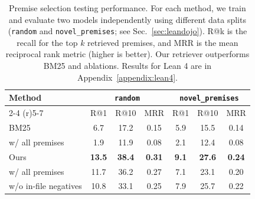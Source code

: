 \begin{table}[ht]
  \centering
  \caption{Premise selection testing performance. For each method, we train and evaluate two models independently using different data splits (\texttt{random} and \texttt{novel\_premises}; see Sec.~\ref{sec:leandojo}). R@k is the recall for the top $k$ retrieved premises, and MRR is the mean reciprocal rank metric (higher is better). Our retriever outperforms BM25 and ablations. Results for Lean 4 are in Appendix~\ref{appendix:lean4}.}
  \begin{tabular}{@{}lcccccc@{}}
    \toprule
     Method & \multicolumn{3}{c}{\texttt{random}} & \multicolumn{3}{c}{\texttt{novel\_premises}} \\
     \cmidrule(r){2-4} \cmidrule(r){5-7} & R@1 & R@10 & MRR & R@1 & R@10 & MRR \\
    \midrule
    BM25 & 6.7 & 17.2 & 0.15 & 5.9 & 15.5 & 0.14\\
    \quad w/ all premises & 1.9 & 11.9 & 0.08 & 2.1 & 12.4 & 0.08 \\
    Ours & \textbf{13.5} & \textbf{38.4} & \textbf{0.31} & \textbf{9.1} & \textbf{27.6} & \textbf{0.24} \\
    \quad w/ all premises & 11.7 & 36.2 & 0.27 & 7.1 & 23.1 & 0.20 \\
    \quad w/o in-file negatives & 10.8 & 33.1 & 0.25 & 7.9 & 25.7 & 0.22 \\
    \bottomrule
  \end{tabular}
  \label{table:premise_selection_results}
\end{table}
